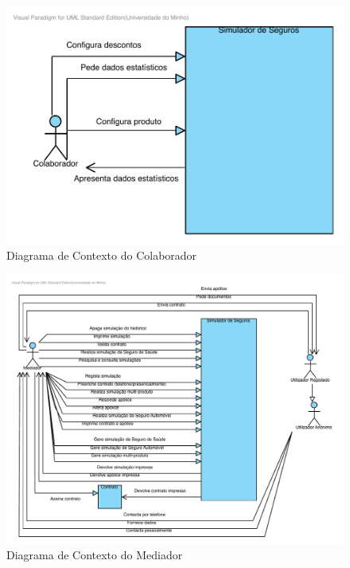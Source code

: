 \begin{itemize}
\begin{figure}[!htb]
	\centering
	\includegraphics[scale=0.75]{images/DiagramaContextoColaborador}
	\caption{Diagrama de Contexto do Colaborador}
\end{figure}

\begin{figure}[!htb]
	\centering
	\includegraphics[scale=0.9]{images/DiagramaContextoMediador}
	\caption{Diagrama de Contexto do Mediador}
\end{figure}


\end{itemize}
